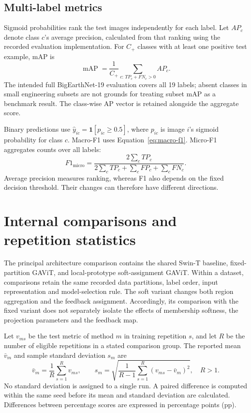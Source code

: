 \subsection{Multi-label metrics}

Sigmoid probabilities rank the test images independently for each label.
Let $AP_c$ denote class $c$'s average precision, calculated from that ranking
using the recorded evaluation implementation. For $C_+$ classes with at
least one positive test example, mAP is
\begin{equation}
 \operatorname{mAP}=\frac{1}{C_+}
                 \sum_{c:\,TP_c+FN_c>0}AP_c.
 \label{eq:map}
\end{equation}
The intended full BigEarthNet-19 evaluation covers all 19 labels; absent
classes in small engineering subsets are not grounds for treating subset
mAP as a benchmark result. The class-wise AP vector is retained alongside
the aggregate score.

Binary predictions use $\hat{y}_{ic}=\mathbf{1}[p_{ic}\geq0.5]$, where
$p_{ic}$ is image $i$'s sigmoid probability for class $c$. Macro-F1 uses
Equation~\eqref{eq:macro-f1}. Micro-F1 aggregates counts over all labels:
\begin{equation}
 F1_{\mathrm{micro}}=
 \frac{2\sum_c TP_c}
 {2\sum_c TP_c+\sum_c FP_c+\sum_c FN_c}.
 \label{eq:micro-f1}
\end{equation}
Average precision measures ranking, whereas F1 also depends on the fixed
decision threshold. Their changes can therefore have different directions.

\section{Internal comparisons and repetition statistics}

The principal architecture comparison contains the shared Swin-T baseline,
fixed-partition GAViT, and local-prototype soft-assignment GAViT. Within a
dataset, comparisons retain the same recorded data partitions, label order,
input representation and model-selection rule. The soft variant changes
both region aggregation and the feedback assignment. Accordingly, its
comparison with the fixed variant does not separately isolate the effects
of membership softness, the projection parameters and the feedback map.

Let $v_{ms}$ be the test metric of method $m$ in training repetition $s$, and
let $R$ be the number of eligible repetitions in a stated comparison group.
The reported mean $\bar{v}_m$ and sample standard deviation $s_m$ are
\begin{equation}
 \bar{v}_m=\frac{1}{R}\sum_{s=1}^{R}v_{ms},
 \qquad
 s_m=\sqrt{\frac{1}{R-1}\sum_{s=1}^{R}
                    (v_{ms}-\bar{v}_m)^2},\quad R>1.
 \label{eq:repeat-statistics}
\end{equation}
No standard deviation is assigned to a single run. A paired difference is
computed within the same seed before its mean and standard deviation are
calculated. Differences between percentage scores are expressed in
percentage points (pp).

